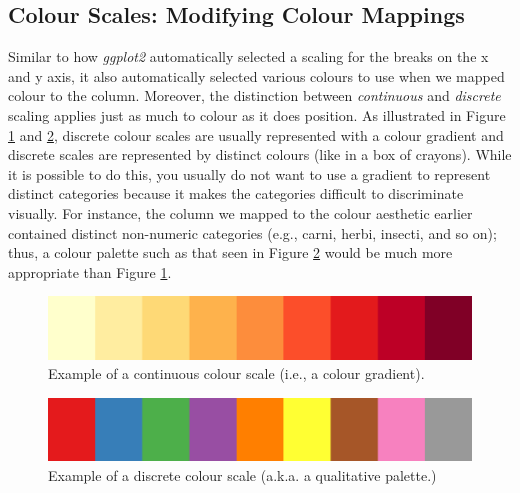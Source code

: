 \subsection{Colour Scales: Modifying Colour Mappings}

Similar to how \textit{ggplot2} automatically selected a scaling for the breaks on the x and y axis, it also automatically selected various colours to use when we mapped colour to the  column. Moreover, the distinction between \textit{continuous} and \textit{discrete} scaling applies just as much to colour as it does position. As illustrated in Figure \ref{fig:continuous_col_scale} and \ref{fig:discrete_col_scale}, discrete colour scales are usually represented with a colour gradient and discrete scales are represented by distinct colours (like in a box of crayons). While it is possible to do this, you usually do not want to use a gradient to represent distinct categories because it makes the categories difficult to discriminate visually. For instance, the  column we mapped to the colour aesthetic earlier contained distinct non-numeric categories (e.g., carni, herbi, insecti, and so on); thus, a colour palette such as that seen in Figure \ref{fig:discrete_col_scale} would be much more appropriate than Figure \ref{fig:continuous_col_scale}.

\vspace{2em}

\begin{figure}[h]
\centering
\includegraphics[scale = .4]{graphics/ch2Figs/col_gradient.pdf}
\caption{Example of a continuous colour scale (i.e., a colour gradient).}
\label{fig:continuous_col_scale}
\end{figure}

\vspace{2em}

\begin{figure}[H]
\centering
\includegraphics[scale = .4]{graphics/ch2Figs/col_discrete.pdf}
\caption{Example of a discrete colour scale (a.k.a. a qualitative palette.)}
\label{fig:discrete_col_scale}
\end{figure}


